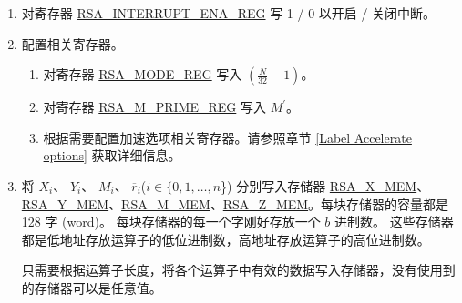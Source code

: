 \documentclass[main\_\_CN.tex]{subfiles}
\begin{document}
\begin{enumerate}

    \item 对寄存器 \hyperref[regdesc:RSAINTERRUPTENAREG]{RSA\_INTERRUPT\_ENA\_REG} 写 1 / 0 以开启 / 关闭中断。

    \item 配置相关寄存器。

    \begin{enumerate}
        \item 对寄存器 \hyperref[regdesc:RSAMODEREG]{RSA\_MODE\_REG} 写入 \begin{math}( \frac{N}{32} - 1 )\end{math}。

        \item 对寄存器 \hyperref[regdesc:RSAMPRIMEREG]{RSA\_M\_PRIME\_REG} 写入 \begin{math}M^{\prime}\end{math}。

        \item 根据需要配置加速选项相关寄存器。请参照章节 \ref{Label Accelerate options} 获取详细信息。
    \end{enumerate}

    \item 将
        \begin{math}X_{i}\end{math}、
        \begin{math}Y_{i}\end{math}、
        \begin{math}M_{i}\end{math}、
        \begin{math}\overline{r}_{i}\end{math}(\begin{math}i \in \{ 0, 1, \dots, n \end{math}\})
        分别写入存储器 \hyperref[regdesc:RSAmemory]{RSA\_X\_MEM}、\hyperref[regdesc:RSAmemory]{\hyperref[regdesc:RSAmemory]{RSA\_Y\_MEM}}、\hyperref[regdesc:RSAmemory]{RSA\_M\_MEM}、\hyperref[regdesc:RSAmemory]{RSA\_Z\_MEM}。每块存储器的容量都是 128 字 (word)。
        每块存储器的每一个字刚好存放一个 \begin{math}b\end{math} 进制数。
        这些存储器都是低地址存放运算子的低位进制数，高地址存放运算子的高位进制数。

        只需要根据运算子长度，将各个运算子中有效的数据写入存储器，没有使用到的存储器可以是任意值。


\end{enumerate}
\end{document}
